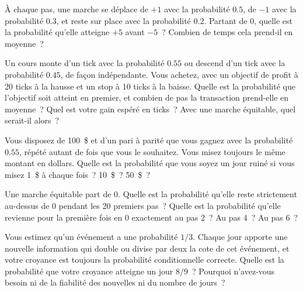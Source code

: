 \begin{question}\label{iq:iv1:random-walks-and-martingales:10}
À chaque pas, une marche se déplace de $+1$ avec la probabilité $0.5$, de $-1$ avec la probabilité $0.3$, et reste sur place avec la probabilité $0.2$. Partant de 0, quelle est la probabilité qu'elle atteigne $+5$ avant $-5$~? Combien de temps cela prend-il en moyenne~?
\end{question}

\begin{question}\label{iq:iv1:random-walks-and-martingales:11}
Un cours monte d'un tick avec la probabilité $0.55$ ou descend d'un tick avec la probabilité $0.45$, de façon indépendante. Vous achetez, avec un objectif de profit à 20 ticks à la hausse et un stop à 10 ticks à la baisse. Quelle est la probabilité que l'objectif soit atteint en premier, et combien de pas la transaction prend-elle en moyenne~? Quel est votre gain espéré en ticks~? Avec une marche équitable, quel serait-il alors~?
\end{question}

\begin{question}\label{iq:iv1:random-walks-and-martingales:12}
Vous disposez de 100~\$ et d'un pari à parité que vous gagnez avec la probabilité $0.55$, répété autant de fois que vous le souhaitez. Vous misez toujours le même montant en dollars. Quelle est la probabilité que vous soyez un jour ruiné si vous misez 1~\$ à chaque fois~? 10~\$~? 50~\$~?
\end{question}

\begin{question}\label{iq:iv1:random-walks-and-martingales:13}
Une marche équitable part de 0. Quelle est la probabilité qu'elle reste strictement au-dessus de 0 pendant les 20 premiers pas~? Quelle est la probabilité qu'elle revienne pour la première fois en 0 exactement au pas 2~? Au pas 4~? Au pas 6~?
\end{question}

\begin{question}\label{iq:iv1:random-walks-and-martingales:14}
Vous estimez qu'un événement a une probabilité $1/3$. Chaque jour apporte une nouvelle information qui double ou divise par deux la cote de cet événement, et votre croyance est toujours la probabilité conditionnelle correcte. Quelle est la probabilité que votre croyance atteigne un jour $8/9$~? Pourquoi n'avez-vous besoin ni de la fiabilité des nouvelles ni du nombre de jours~?
\end{question}

